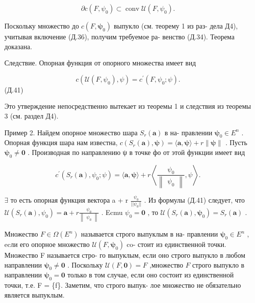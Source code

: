 \documentclass[8pt]{extarticle}
\begin{document}
\[
\partial c\left( {F,{\psi }_{0}}\right)  \subset  \operatorname{conv}\mathcal{U}\left( {F,{\psi }_{0}}\right) .
\]

Поскольку множество до \(c\left( {F,{\mathbf{\psi }}_{0}}\right)\) выпукло (см. теорему 1 из раз- дела Д4), учитывая включение (Д.36), получим требуемое ра- венство (Д.34). Теорема доказана.

Следствие. Опорная функция от опорного множества имеет вид

\[
c\left( {\mathcal{U}\left( {F,{\psi }_{0}}\right) ,\psi }\right)  = {c}^{\prime }\left( {F,{\psi }_{0};\psi }\right) .
\]
 (Д.41)

Это утверждение непосредственно вытекает из теоремы 1 и следствия из теоремы 3 (см. раздел Д4).

Пример 2. Найдем опорное множество шара \({S}_{r}\left( \mathbf{a}\right)\) в на- правлении \({\mathbf{\psi }}_{0} \in  {E}^{n}\) . Опорная функция шара нам известна, \(c\left( {{S}_{r}\left( \mathbf{a}\right) ,\mathbf{\psi }}\right)  = \langle \mathbf{a},\mathbf{\psi }\rangle  + r\parallel \mathbf{\psi }\parallel\) . Пусть \({\mathbf{\psi }}_{0} \neq  \mathbf{0}\) . Производная по направлению ψ в точке фо от этой функции имеет вид

\[
{c}^{\prime }\left( {{S}_{r}\left( \mathbf{a}\right) ,{\psi }_{0};\psi }\right)  = \langle \mathbf{a},\mathbf{\psi }\rangle  + r\left\langle  {\frac{{\psi }_{0}}{\left\lVert \begin{array}{c} {\psi }_{0} \end{array} \right\rVert},\psi }\right\rangle  .
\]

\(\exists\) то есть опорная функция вектора a + r \(\frac{{\psi }_{0}}{\left| \right| {\psi }_{0}\left| \right| }\) . Из формулы (Д.41) следует, что \(\mathcal{U}\left( {{S}_{r}\left( \mathbf{a}\right) ,{\psi }_{0}}\right)  = \mathbf{a} + r\frac{{\psi }_{0}}{\left\lVert \begin{array}{c} {\psi }_{0} \end{array} \right\rVert}\) . Ecmu \({\psi }_{0} = \mathbf{0}\) , то \(\mathcal{U}\left( {{S}_{r}\left( \mathbf{a}\right) ,{\mathbf{\psi }}_{0}}\right)  = {S}_{r}\left( \mathbf{a}\right)\) .

Множество \(F \in  \Omega \left( {E}^{n}\right)\) называется строго выпуклым в на- правлении \({\mathbf{\psi }}_{0} \in  {E}^{n}\) , ecли его опорное множество \(\mathcal{U}\left( {F,{\mathbf{\psi }}_{0}}\right)\) co- стоит из единственной точки. Множество F называется стро- го выпуклым, если оно строго выпукло в любом направлении \({\mathbf{\psi }}_{0} \neq  \mathbf{0}\) . Поскольку \(\mathcal{U}\left( {F,\mathbf{0}}\right)  = F\) ,множество \(F\) строго выпукло в направлении \({\mathbf{\psi }}_{0} = \mathbf{0}\) только в том случае, если оно состоит из единственной точки, т.е. F = \{f\}. Заметим, что строго выпук- лое множество не обязательно является выпуклым.
\end{document}
